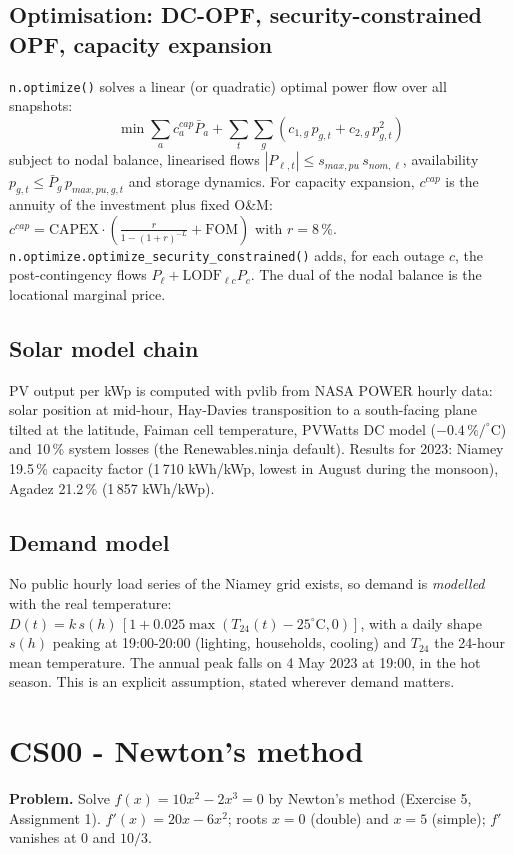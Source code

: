 \documentclass[11pt,a4paper]{article}
\begin{document}
\subsection{Optimisation: DC-OPF, security-constrained OPF, capacity expansion}
\texttt{n.optimize()} solves a linear (or quadratic) optimal power flow over all snapshots:
\begin{equation}
\min \sum_a c^{cap}_a \bar P_a + \sum_t\sum_g \left(c_{1,g}\,p_{g,t} + c_{2,g}\,p_{g,t}^2\right)
\end{equation}
subject to nodal balance, linearised flows $|P_{\ell,t}| \le s_{max,pu}\,s_{nom,\ell}$,
availability $p_{g,t} \le \bar P_g\,p_{max,pu,g,t}$ and storage dynamics. For capacity
expansion, $c^{cap}$ is the annuity of the investment plus fixed O\&M:
$c^{cap} = \text{CAPEX}\cdot\left(\frac{r}{1-(1+r)^{-L}} + \text{FOM}\right)$ with $r = 8\,\%$.
\texttt{n.optimize.optimize\_security\_constrained()} adds, for each outage $c$, the
post-contingency flows $P_\ell + \text{LODF}_{\ell c} P_c$. The dual of the nodal balance is
the locational marginal price.

\subsection{Solar model chain}\label{sec:pv}
PV output per kWp is computed with pvlib from NASA POWER hourly data: solar position at
mid-hour, Hay-Davies transposition to a south-facing plane tilted at the latitude, Faiman cell
temperature, PVWatts DC model ($-0.4\,\%/^\circ$C) and 10\,\% system losses (the
Renewables.ninja default). Results for 2023: Niamey 19.5\,\% capacity factor
(1\,710 kWh/kWp, lowest in August during the monsoon), Agadez 21.2\,\% (1\,857 kWh/kWp).

\subsection{Demand model}
No public hourly load series of the Niamey grid exists, so demand is \emph{modelled} with the
real temperature: $D(t) = k\,s(h)\,[1 + 0.025\max(T_{24}(t) - 25^\circ\text{C}, 0)]$, with a
daily shape $s(h)$ peaking at 19:00-20:00 (lighting, households, cooling) and $T_{24}$ the
24-hour mean temperature. The annual peak falls on 4 May 2023 at 19:00, in the hot season.
This is an explicit assumption, stated wherever demand matters.

\section{CS00 - Newton's method}
\textbf{Problem.} Solve $f(x) = 10x^2 - 2x^3 = 0$ by Newton's method (Exercise 5, Assignment 1).
$f'(x) = 20x - 6x^2$; roots $x = 0$ (double) and $x = 5$ (simple); $f'$ vanishes at $0$ and $10/3$.
\end{document}
